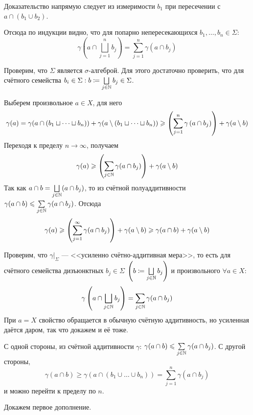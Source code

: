 \documentclass[a4paper]{report}
\begin{document}
{{        Доказательство напрямую следует из измеримости $b_1$ при пересечении с $a \cap (b_1 \cup b_2)$.

        Отсюда по индукции видно, что для попарно непересекающихся $b_1, \dots, b_n \in \Sigma$:
        \[\gamma\left( a \cap \bigsqcup\limits_{j = 1}^{n}b_j\right) = \sum\limits_{j = 1}^{n}\gamma(a \cap b_j)\]

        \item Проверим, что $\Sigma$ является $\sigma$-алгеброй.
        Для этого достаточно проверить, что для счётного семейства $b_i \in \Sigma: b \coloneqq \bigsqcup\limits_{j \in \mathbb{N}}b_j \in \Sigma$.


        Выберем произвольное $a \in X$, для него
        \[\gamma(a) = \gamma(a \cap (b_1 \sqcup \dots \sqcup b_n)) + \gamma(a \setminus (b_1 \sqcup \dots \sqcup b_n)) \geqslant \left(\sum\limits_{j = 1}^{n}\gamma\left(a \cap b_j\right)\right) + \gamma(a \setminus b)\]
        Переходя к пределу $n \to \infty$, получаем
        \[\gamma(a) \geqslant \left(\sum\limits_{j \in\mathbb{N}}\gamma(a \cap b_j)\right) + \gamma(a \setminus b)\]
        Так как $a \cap b = \bigsqcup\limits_{j \in \mathbb{N}}(a \cap b_j)$, то из счётной полуаддитивности $\gamma(a \cap b) \leqslant \sum\limits_{j \in \mathbb{N}}\gamma(a \cap b_j)$.
        Отсюда
        \[\gamma(a) \geqslant \left(\sum\limits_{j = 1}^{\infty}\gamma(a \cap b_j)\right) + \gamma(a \setminus b) \geqslant \gamma(a \cap b) + \gamma(a \setminus b)\]
        \item Проверим, что $\gamma\big|_\Sigma$ --- <<усиленно счётно-аддитивная мера>>, то есть для счётного семейства дизъюнктных $b_j \in \Sigma$ $\left(b \coloneqq \bigsqcup\limits_{j \in \mathbb{N}}b_j\right)$ и произвольного $\forall a \in X$:
        \[\gamma\left( a\cap\bigsqcup\limits_{j \in \mathbb{N}}b_j\right) = \sum\limits_{j \in \mathbb{N}}\gamma(a \cap b_j)\]
        При $a = X$ свойство обращается в обычную счётную аддитивность, но усиленная даётся даром, так что докажем и её тоже.

        С одной стороны, из счётной аддитивности $\gamma$: $\gamma(a \cap b) \leqslant \sum\limits_{j \in \mathbb{N}}\gamma(a \cap b_j)$.
        С другой стороны, \[\gamma( a\cap b) \ge \gamma(a \cap (b_1 \cup \dots \cup b_n)) = \sum\limits_{j = 1}^{n}\gamma(a \cap b_j)\]
        и можно перейти к пределу по $n$.
        \item Докажем первое дополнение.

}}
\end{document}
